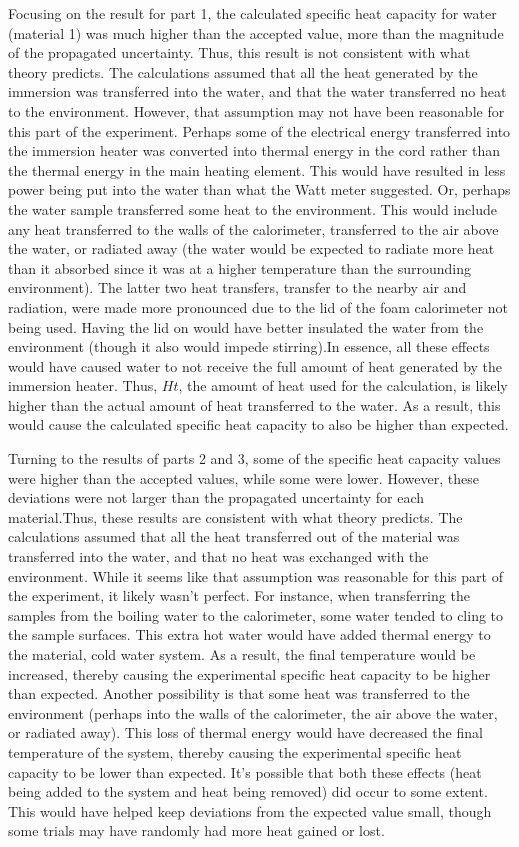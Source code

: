 \documentclass[12pt]{iopart} %
\begin{document}
Focusing on the result for part 1, the calculated specific heat capacity for water (material 1) was much higher than the accepted value, more than the magnitude of the propagated uncertainty.
Thus, this result is not consistent with what theory predicts.
The calculations assumed that all the heat generated by the immersion was transferred into the water, and that the water transferred no heat to the environment.
However, that assumption may not have been reasonable for this part of the experiment.
Perhaps some of the electrical energy transferred into the immersion heater was converted into thermal energy in the cord rather than the thermal energy in the main heating element.
This would have resulted in less power being put into the water than what the Watt meter suggested.
Or, perhaps the water sample transferred some heat to the environment.
This would include any heat transferred to the walls of the calorimeter, transferred to the air above the water, or radiated away (the water would be expected to radiate more heat than it absorbed since it was at a higher temperature than the surrounding environment).
The latter two heat transfers, transfer to the nearby air and radiation, were made more pronounced due to the lid of the foam calorimeter not being used.
Having the lid on would have better insulated the water from the environment (though it also would impede stirring).In essence, all these effects would have caused water to not receive the full amount of heat generated by the immersion heater.
Thus, $Ht$, the amount of heat used for the calculation, is likely higher than the actual amount of heat transferred to the water.
As a result, this would cause the calculated specific heat capacity to also be higher than expected.

Turning to the results of parts 2 and 3, some of the specific heat capacity values were higher than the accepted values, while some were lower.
However, these deviations were not larger than the propagated uncertainty for each material.Thus, these results are consistent with what theory predicts.
The calculations assumed that all the heat transferred out of the material was transferred into the water, and that no heat was exchanged with the environment.
While it seems like that assumption was reasonable for this part of the experiment, it likely wasn't perfect.
For instance, when transferring the samples from the boiling water to the calorimeter, some water tended to cling to the sample surfaces.
This extra hot water would have added thermal energy to the material, cold water system.
As a result, the final temperature would be increased, thereby causing the experimental specific heat capacity to be higher than expected.
Another possibility is that some heat was transferred to the environment (perhaps into the walls of the calorimeter, the air above the water, or radiated away).
This loss of thermal energy would have decreased the final temperature of the system, thereby causing the experimental specific heat capacity to be lower than expected.
It's possible that both these effects (heat being added to the system and heat being removed) did occur to some extent.
This would have helped keep deviations from the expected value small, though some trials may have randomly had more heat gained or lost.
\end{document}
